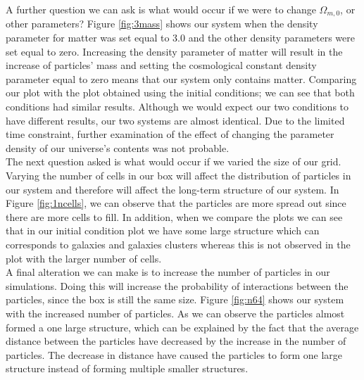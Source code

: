 \documentclass[10pt]{article}
\begin{document}
	A further question we can ask is what would occur if we were to change $\Omega_{m,0}$, or other parameters? Figure \ref{fig:3mass} shows our system when the density parameter for matter was set equal to 3.0 and the other density parameters were set equal to zero. Increasing the density parameter of matter will result in the increase of particles’ mass and setting the cosmological constant density parameter equal to zero means that our system only contains matter. Comparing our plot with the plot obtained using the initial conditions; we can see that both conditions had similar results. Although we would expect our two conditions to have different results, our two systems are almost identical. Due to the limited time constraint, further examination of the effect of changing the parameter density of our universe’s contents was not probable.\\

	The next question asked is what would occur if we varied the size of our grid. Varying the number of cells in our box will affect the distribution of particles in our system and therefore will affect the long-term structure of our system. In Figure \ref{fig:1ncells}, we can observe that the particles are more spread out since there are more cells to fill. In addition, when we compare the plots we can see that in our initial condition plot we have some large structure which can corresponds to galaxies and galaxies clusters whereas this is not observed in the plot with the larger number of cells.\\
	
	A final alteration we can make is to increase the number of particles in our simulations. Doing this will increase the probability of interactions between the particles, since the box is still the same size. Figure \ref{fig:n64} shows our system with the increased number of particles. As we can observe the particles almost formed a one large structure, which can be explained by the fact that the average distance between the particles have decreased by the increase in the number of particles. The decrease in distance have caused the particles to form one large structure instead of forming multiple smaller structures.   
\end{document}
